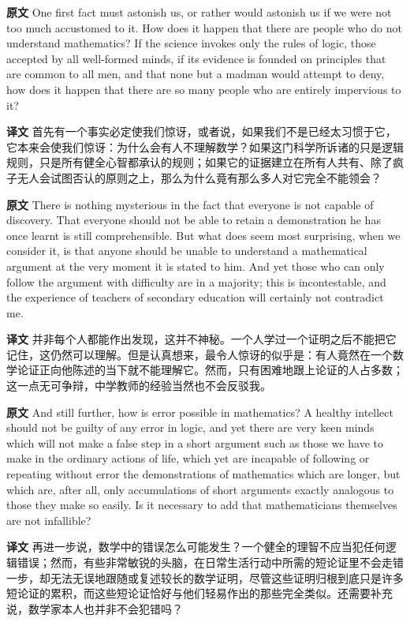 \documentclass[UTF8]{ctexart}
\newenvironment{english}{\par\small\noindent\textbf{原文}\quad\ignorespaces}{\par}
\newenvironment{zhtranslation}{\par\noindent\textbf{译文}\quad\ignorespaces}{\par\vspace{0.35em}}
\begin{document}
\begin{english}
One first fact must astonish us, or rather would astonish us if we were not too much accustomed to it. How does it happen that there are people who do not understand mathematics? If the science invokes only the rules of logic, those accepted by all well-formed minds, if its evidence is founded on principles that are common to all men, and that none but a madman would attempt to deny, how does it happen that there are so many people who are entirely impervious to it?
\end{english}
\begin{zhtranslation}
首先有一个事实必定使我们惊讶，或者说，如果我们不是已经太习惯于它，它本来会使我们惊讶：为什么会有人不理解数学？如果这门科学所诉诸的只是逻辑规则，只是所有健全心智都承认的规则；如果它的证据建立在所有人共有、除了疯子无人会试图否认的原则之上，那么为什么竟有那么多人对它完全不能领会？
\end{zhtranslation}

\begin{english}
There is nothing mysterious in the fact that everyone is not capable of discovery. That everyone should not be able to retain a demonstration he has once learnt is still comprehensible. But what does seem most surprising, when we consider it, is that anyone should be unable to understand a mathematical argument at the very moment it is stated to him. And yet those who can only follow the argument with difficulty are in a majority; this is incontestable, and the experience of teachers of secondary education will certainly not contradict me.
\end{english}
\begin{zhtranslation}
并非每个人都能作出发现，这并不神秘。一个人学过一个证明之后不能把它记住，这仍然可以理解。但是认真想来，最令人惊讶的似乎是：有人竟然在一个数学论证正向他陈述的当下就不能理解它。然而，只有困难地跟上论证的人占多数；这一点无可争辩，中学教师的经验当然也不会反驳我。\end{zhtranslation}

\begin{english}
And still further, how is error possible in mathematics? A healthy intellect should not be guilty of any error in logic, and yet there are very keen minds which will not make a false step in a short argument such as those we have to make in the ordinary actions of life, which yet are incapable of following or repeating without error the demonstrations of mathematics which are longer, but which are, after all, only accumulations of short arguments exactly analogous to those they make so easily. Is it necessary to add that mathematicians themselves are not infallible?
\end{english}
\begin{zhtranslation}
再进一步说，数学中的错误怎么可能发生？一个健全的理智不应当犯任何逻辑错误；然而，有些非常敏锐的头脑，在日常生活行动中所需的短论证里不会走错一步，却无法无误地跟随或复述较长的数学证明，尽管这些证明归根到底只是许多短论证的累积，而这些短论证恰好与他们轻易作出的那些完全类似。还需要补充说，数学家本人也并非不会犯错吗？\end{zhtranslation}
\end{document}
